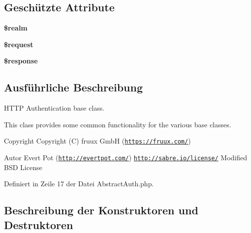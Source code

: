 \subsection*{Geschützte Attribute}
\begin{DoxyCompactItemize}
\item 
\mbox{\label{class_sabre_1_1_h_t_t_p_1_1_auth_1_1_abstract_auth_a59df9e3d46cdc7aaf970550826378256}} 
{\bfseries \$realm}
\item 
\mbox{\label{class_sabre_1_1_h_t_t_p_1_1_auth_1_1_abstract_auth_a7e6adf955fd3e168312f350d55eb2864}} 
{\bfseries \$request}
\item 
\mbox{\label{class_sabre_1_1_h_t_t_p_1_1_auth_1_1_abstract_auth_a39b5b47ecff3025b744108d8a434d477}} 
{\bfseries \$response}
\end{DoxyCompactItemize}


\subsection{Ausführliche Beschreibung}
H\+T\+TP Authentication base class.

This class provides some common functionality for the various base classes.

\begin{DoxyCopyright}{Copyright}
Copyright (C) fruux GmbH (\href{https://fruux.com/}{\tt https\+://fruux.\+com/}) 
\end{DoxyCopyright}
\begin{DoxyAuthor}{Autor}
Evert Pot (\href{http://evertpot.com/}{\tt http\+://evertpot.\+com/})  \href{http://sabre.io/license/}{\tt http\+://sabre.\+io/license/} Modified B\+SD License 
\end{DoxyAuthor}


Definiert in Zeile 17 der Datei Abstract\+Auth.\+php.



\subsection{Beschreibung der Konstruktoren und Destruktoren}
\mbox{\label{class_sabre_1_1_h_t_t_p_1_1_auth_1_1_abstract_auth_a3e57c1181e92b05fb4061b17e00b19ad}} 
